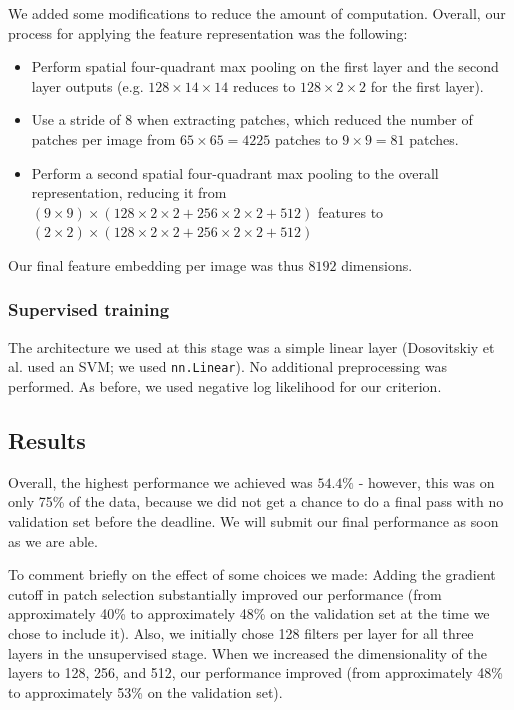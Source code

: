 \documentclass{article} %
\newenvironment{itemizedense}{
\begin{itemize}
  \setlength{\itemsep}{1pt}
  \setlength{\parskip}{0pt}
  \setlength{\parsep}{0pt}
}{\end{itemize}}
\begin{document}
We added some modifications to reduce the amount of computation. Overall, our process for applying the feature representation was the following:
\begin{itemizedense}
\item Perform spatial four-quadrant max pooling on the first layer and the second layer outputs (e.g. $128 \times 14 \times 14$ reduces to $128 \times 2 \times 2$ for the first layer).
\item Use a stride of 8 when extracting patches, which reduced the number of patches per image from $65\times65=4225$ patches to $9 \times 9 = 81$ patches.
\item Perform a second spatial four-quadrant max pooling to the overall representation, reducing it from $(9\times9) \times (128 \times 2 \times 2 + 256 \times 2 \times 2 + 512)$ features to $(2\times2) \times (128 \times 2 \times 2 + 256 \times 2 \times 2 + 512)$
\end{itemizedense}

Our final feature embedding per image was thus $8192$ dimensions.

\subsubsection{Supervised training}
The architecture we used at this stage was a simple linear layer (Dosovitskiy et al. used an SVM; we used \texttt{nn.Linear}). No additional preprocessing was performed. As before, we used negative log likelihood for our criterion.

\subsection{Results}

Overall, the highest performance we achieved was $54.4\%$ - however, this was on only 75\% of the data, because we did not get a chance to do a final pass with no validation set before the deadline. We will submit our final performance as soon as we are able.

To comment briefly on the effect of some choices we made: Adding the gradient cutoff in patch selection substantially improved our performance (from approximately 40\% to approximately 48\% on the validation set at the time we chose to include it). Also, we initially chose 128 filters per layer for all three layers in the unsupervised stage. When we increased the dimensionality of the layers to 128, 256, and 512, our performance improved (from approximately 48\% to approximately 53\% on the validation set).
\end{document}
